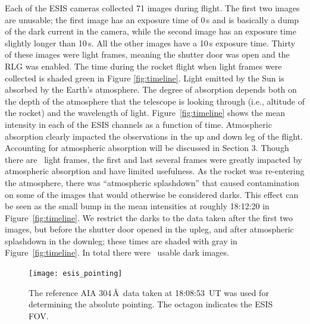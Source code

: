 		
	
		Each of the ESIS cameras collected 71 images during flight.  The first two images are unusable; the first image has an exposure time of 0\,s and is basically a dump of the dark current in the camera, while the second image has an exposure time slightly longer than 10\,s.  All the other images have a 10\,s exposure time.  Thirty of these images were light frames, meaning the shutter door was open and the RLG was enabled. The time during the rocket flight when light frames were collected is shaded green in Figure \ref{fig:timeline}.  Light emitted by the Sun is absorbed by the Earth's atmosphere.  The degree of absorption depends both on the depth of the atmosphere that the telescope is looking through (i.e., altitude of the rocket) and the wavelength of light.  Figure~\ref{fig:timeline} shows the mean intensity in each of the ESIS channels as a function of time.  Atmospheric absorption clearly impacted the observations in the up and down leg of the flight.  Accounting for atmospheric absorption will be discussed in Section 3.  Though there are \numDataFrames\ light frames, the first and last several frames were greatly impacted by atmospheric absorption and have limited usefulness.  As the rocket was re-entering the atmosphere, there was  ``atmospheric splashdown'' that caused contamination on some of the images that would otherwise be considered darks.  This effect can be seen as the small bump in the mean intensities at roughly 18:12:20 in Figure~\ref{fig:timeline}.  We restrict the darks to the data taken after the first two images, but before the shutter door opened in the upleg, and after atmospheric splashdown in the downleg; these times are shaded with gray in Figure~\ref{fig:timeline}.  In total there were \numDarkFrames\ usable dark images.  
		
		
		\begin{figure}[ht]
			\begin{center}
				\texttt{[image: esis\_pointing]}
				\caption{The reference AIA 304\,\AA\ data taken at 18:08:53~UT was used for determining the absolute pointing. The octagon indicates the ESIS FOV.}
				\label{fig:fov}
			\end{center}
		\end{figure}
	

